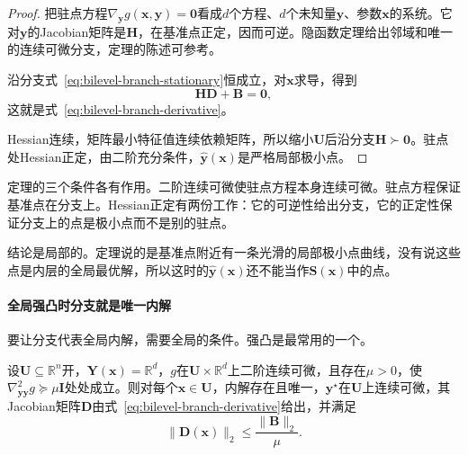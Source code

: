 \begin{proof}
把驻点方程$\nabla_{\bm{y}}g(\bm{x},\bm{y})=\bm{0}$看成$d$个方程、$d$个未知量$\bm{y}$、参数$\bm{x}$的系统。它对$\bm{y}$的Jacobian矩阵是$\bm{H}$，在基准点正定，因而可逆。隐函数定理给出邻域和唯一的连续可微分支，定理的陈述可参考。

沿分支式~\eqref{eq:bilevel-branch-stationary}恒成立，对$\bm{x}$求导，得到
\[
 \bm{H}\bm{D}+\bm{B}=\bm{0},
\]
这就是式~\eqref{eq:bilevel-branch-derivative}。

Hessian连续，矩阵最小特征值连续依赖矩阵，所以缩小$\bm{U}$后沿分支$\bm{H}\succ\bm{0}$。驻点处Hessian正定，由二阶充分条件，$\hat{\bm{y}}(\bm{x})$是严格局部极小点。
\end{proof}

定理的三个条件各有作用。二阶连续可微使驻点方程本身连续可微。驻点方程保证基准点在分支上。Hessian正定有两份工作：它的可逆性给出分支，它的正定性保证分支上的点是极小点而不是别的驻点。

结论是局部的。定理说的是基准点附近有一条光滑的局部极小点曲线，没有说这些点是内层的全局最优解，所以这时的$\hat{\bm{y}}(\bm{x})$还不能当作$\bm{S}(\bm{x})$中的点。

\paragraph{全局强凸时分支就是唯一内解}
要让分支代表全局内解，需要全局的条件。强凸是最常用的一个。

\begin{theorem}[强凸内层的解映射]
\label{thm:bilevel-strong-convex-map}
设$\bm{U}\subseteq\mathbb{R}^n$开，$\bm{Y}(\bm{x})=\mathbb{R}^d$，$g$在$\bm{U}\times\mathbb{R}^d$上二阶连续可微，且存在$\mu>0$，使$\nabla^2_{\bm{y}\bm{y}}g\succeq\mu\bm{I}$处处成立。则对每个$\bm{x}\in\bm{U}$，内解存在且唯一，$\bm{y}^\star$在$\bm{U}$上连续可微，其Jacobian矩阵$\bm{D}$由式~\eqref{eq:bilevel-branch-derivative}给出，并满足
\begin{equation}
 \lVert\bm{D}(\bm{x})\rVert_2\leq\frac{\lVert\bm{B}\rVert_2}{\mu}.
 \label{eq:bilevel-map-lipschitz}
\end{equation}
\end{theorem}

